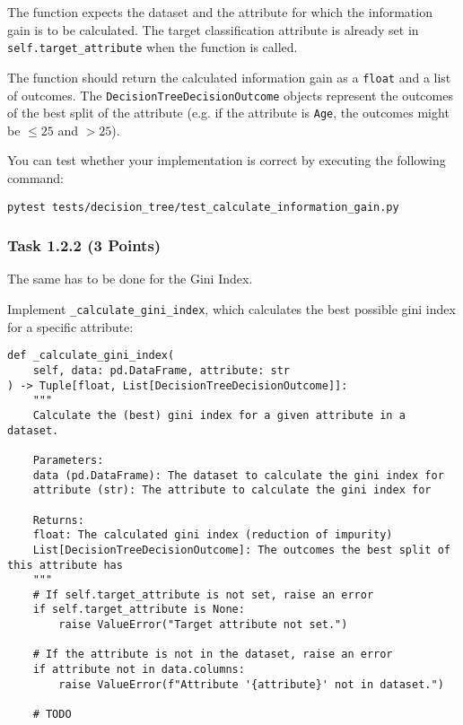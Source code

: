 \documentclass[
english,
smallborders
]{i6prcsht}
\newcommand{\points}[1]{\hfill \color{red}(#1 Points)\color{black}}
\begin{document}
\vspace*{0.1cm}

The function expects the dataset and the attribute for which the information gain is to be calculated. The target classification attribute is already set in \texttt{self.target\_attribute} when the function is called.

The function should return the calculated information gain as a \texttt{float} and a list of outcomes. The \texttt{DecisionTreeDecisionOutcome} objects represent the outcomes of the best split of the attribute (e.g. if the attribute is \texttt{Age}, the outcomes might be \texttt{$\leq 25$} and \texttt{$> 25$}).

You can test whether your implementation is correct by executing the following command:

\vspace*{0.3cm}

\begin{lstlisting}
pytest tests/decision_tree/test_calculate_information_gain.py
\end{lstlisting}

\vspace*{0.1cm}

\subsubsection*{Task 1.2.2 \points{3}}

The same has to be done for the Gini Index.

Implement \texttt{\_calculate\_gini\_index}, which calculates the best possible gini index for a specific attribute:

\vspace*{0.3cm}

\begin{lstlisting}
def _calculate_gini_index(
	self, data: pd.DataFrame, attribute: str
) -> Tuple[float, List[DecisionTreeDecisionOutcome]]:
	"""
	Calculate the (best) gini index for a given attribute in a dataset.

	Parameters:
	data (pd.DataFrame): The dataset to calculate the gini index for
	attribute (str): The attribute to calculate the gini index for

	Returns:
	float: The calculated gini index (reduction of impurity)
	List[DecisionTreeDecisionOutcome]: The outcomes the best split of this attribute has
	"""
	# If self.target_attribute is not set, raise an error
	if self.target_attribute is None:
		raise ValueError("Target attribute not set.")

	# If the attribute is not in the dataset, raise an error
	if attribute not in data.columns:
		raise ValueError(f"Attribute '{attribute}' not in dataset.")

	# TODO
\end{lstlisting}
\end{document}
